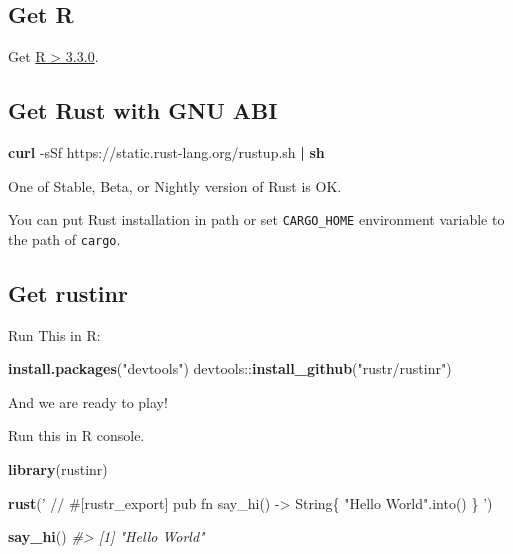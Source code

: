 \documentclass[]{book}
\newenvironment{Shaded}{\begin{snugshade}}{\end{snugshade}}
\newcommand{\KeywordTok}[1]{\textcolor[rgb]{0.13,0.29,0.53}{\textbf{{#1}}}}
\newcommand{\StringTok}[1]{\textcolor[rgb]{0.31,0.60,0.02}{{#1}}}
\newcommand{\CommentTok}[1]{\textcolor[rgb]{0.56,0.35,0.01}{\textit{{#1}}}}
\newcommand{\NormalTok}[1]{{#1}}
\begin{document}
\subsection{Get R}\label{get-r-2}

Get \href{https://cran.r-project.org/}{R \textgreater{} 3.3.0}.

\subsection{Get Rust with GNU ABI}\label{get-rust-with-gnu-abi-2}

\begin{Shaded}
\begin{Highlighting}[]
\KeywordTok{curl} \NormalTok{-sSf https://static.rust-lang.org/rustup.sh }\KeywordTok{|} \KeywordTok{sh}
\end{Highlighting}
\end{Shaded}

One of Stable, Beta, or Nightly version of Rust is OK.

You can put Rust installation in path or set \texttt{CARGO\_HOME}
environment variable to the path of \texttt{cargo}.

\subsection{Get rustinr}\label{get-rustinr-2}

Run This in R:

\begin{Shaded}
\begin{Highlighting}[]
\KeywordTok{install.packages}\NormalTok{(}\StringTok{"devtools"}\NormalTok{)}
\NormalTok{devtools::}\KeywordTok{install_github}\NormalTok{(}\StringTok{"rustr/rustinr"}\NormalTok{)}
\end{Highlighting}
\end{Shaded}

And we are ready to play!

Run this in R console.

\begin{Shaded}
\begin{Highlighting}[]
\KeywordTok{library}\NormalTok{(rustinr)}

\KeywordTok{rust}\NormalTok{(}\StringTok{'}
\StringTok{// #[rustr_export]}
\StringTok{pub fn say_hi() -> String\{}
\StringTok{    "Hello World".into()}
\StringTok{\}}
\StringTok{'}\NormalTok{)}

\KeywordTok{say_hi}\NormalTok{()}
\CommentTok{#> [1] "Hello World"}
\end{Highlighting}
\end{Shaded}
\end{document}
